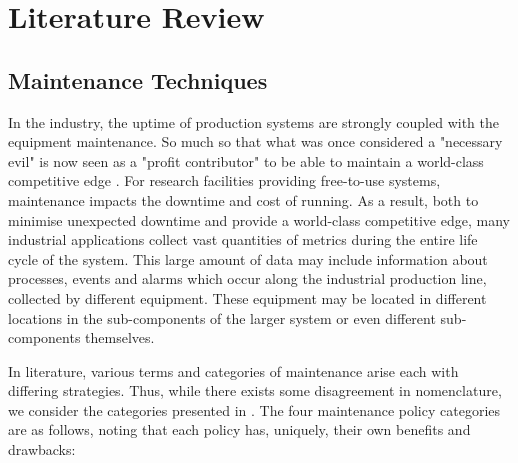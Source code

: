 \documentclass[10pt,oneside]{report}
\begin{document}
\chapter{Literature Review}

\section{Maintenance Techniques}
In the industry, the uptime of production systems are strongly coupled with the equipment maintenance. So much so that what was once considered a "necessary evil" is now seen as a "profit contributor" to be able to maintain a world-class competitive edge \cite{waeyenbergh2002framework, faccio2014industrial}. For research facilities providing free-to-use systems, maintenance impacts the downtime and cost of running. As a result, both to minimise unexpected downtime and provide a world-class competitive edge, many industrial applications collect vast quantities of metrics during the entire life cycle of the system. This large amount of data may include information about processes, events and alarms \cite{carvalho2019systematic} which occur along the industrial production line, collected by different equipment. These equipment may be located in different locations in the sub-components of the larger system or even different sub-components themselves. 

In literature, various terms and categories of maintenance arise each with differing strategies. Thus, while there exists some disagreement in nomenclature, we consider the categories presented in \cite{susto2012predictive}. The four maintenance policy categories are as follows, noting that each policy has, uniquely, their own benefits and drawbacks:
\end{document}
